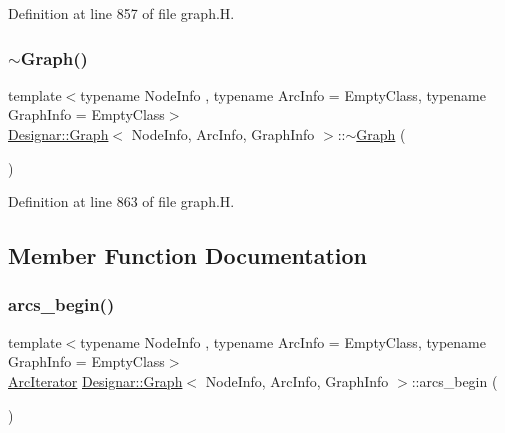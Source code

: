 Definition at line 857 of file graph.\+H.

\mbox{\label{class_designar_1_1_graph_a2ea20f9cb46279210e1eadaebcfe27f0}} 
\subsubsection{\texorpdfstring{$\sim$\+Graph()}{~Graph()}}
{\footnotesize\ttfamily template$<$typename Node\+Info , typename Arc\+Info  = Empty\+Class, typename Graph\+Info  = Empty\+Class$>$ \\
\hyperlink{class_designar_1_1_graph}{Designar\+::\+Graph}$<$ Node\+Info, Arc\+Info, Graph\+Info $>$\+::$\sim$\hyperlink{class_designar_1_1_graph}{Graph} (\begin{DoxyParamCaption}{ }\end{DoxyParamCaption})\hspace{0.3cm}{\ttfamily [inline]}}



Definition at line 863 of file graph.\+H.



\subsection{Member Function Documentation}
\mbox{\label{class_designar_1_1_graph_a9448ba557a7b0ef90651d74d4a4ee36b}} 
\subsubsection{\texorpdfstring{arcs\+\_\+begin()}{arcs\_begin()}\hspace{0.1cm}{\footnotesize\ttfamily [1/4]}}
{\footnotesize\ttfamily template$<$typename Node\+Info , typename Arc\+Info  = Empty\+Class, typename Graph\+Info  = Empty\+Class$>$ \\
\hyperlink{class_designar_1_1_graph_1_1_arc_iterator}{Arc\+Iterator} \hyperlink{class_designar_1_1_graph}{Designar\+::\+Graph}$<$ Node\+Info, Arc\+Info, Graph\+Info $>$\+::arcs\+\_\+begin (\begin{DoxyParamCaption}{ }\end{DoxyParamCaption})\hspace{0.3cm}{\ttfamily [inline]}}



